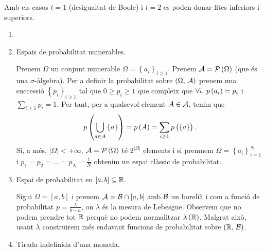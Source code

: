 \begin{obs}
    Amb els casos $t=1$ (desigualtat de Boole) i $t=2$ es poden donar fites inferiors i superiors.
\end{obs}

\begin{example}
    \begin{enumerate}
     \item []
     \item Espais de probabilitat numerables.
     
     Prenem $\Omega$ un conjunt numerable $\Omega =\left\{a_i\right\}_{i\geq 1}$. Prenem $\mathcal{A} = \mathcal{P}\left( \Omega\right)$
     (que és una $\sigma$-àlgebra). Per a definir la probabilitat sobre $\left(\Omega,\,\mathcal{A}\right)$ prenem una successió 
     $\left\{p_i\right\}_{i\geq 1}$ tal que $0\geq p_i\geq 1$ que compleix que $\forall i,\, p\left( a_i\right) = p_i$ i 
     $\sum\limits_{i\geq1}p_i=1$. Per tant, per a qualsevol element $A\in\mathcal{A}$, tenim que
     \[
	p\left(\bigcup\limits_{a\in A} \left\{a\right\}\right) = p\left( A\right) = \sum\limits_{i\geq 1} p\left( \left\{a\right\}\right).
     \]
     Si, a més, $|\Omega|<+\infty$, $\mathcal{A} = \mathcal{P}\left(\Omega\right)$ té $2^{|\Omega|}$ elements i si premnem 
     $\Omega =\left\{a_i\right\}_{i=1}^{N}$ i $p_1=p_2=\dots=p_N = \frac{1}{N}$ obtenim un espai clàssic de probabilitat.
     
     \item Espai de probabilitat en $\left[a,b\right]\subseteq \mathbb{R}$.
     
      Sigui $\Omega=\left[a,b\right]$ i prenem $\mathcal{A}=\mathcal{B}\cap\left[a,b\right]$ amb $\mathcal{B}$ un borelià i com a funció de probabilitat $p=\frac{\lambda}{b-a}$, on $\lambda$
      és la mesura de Lebesgue. Observem que no podem prendre tot $\mathbb{R}$ perquè no podem normalitzar $\lambda\left(\mathbb{R}\right)$. Malgrat això, usant $\lambda$ construirem
      més endavant funcions de probabilitat sobre $\left(\mathbb{R},\,\mathcal{B}\right)$.
      
     \item Tirada indefinida d'una moneda.
     

\end{enumerate}
\end{example}
